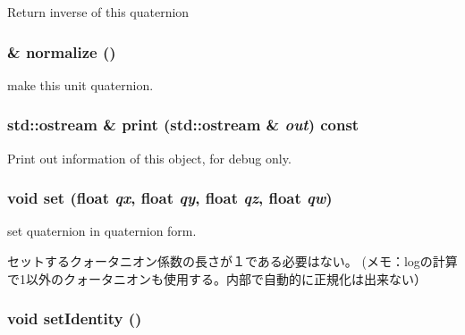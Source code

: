 Return inverse of this quaternion \hypertarget{classm3g_1_1Quaternion_c9cc178bcc449e08499113c35feb2a2b}{
\subsubsection[{normalize}]{ \& normalize ()}}
\label{classm3g_1_1Quaternion_c9cc178bcc449e08499113c35feb2a2b}


make this unit quaternion. \hypertarget{classm3g_1_1Quaternion_6fea17fa1532df3794f8cb39cb4f911f}{
\subsubsection[{print}]{\setlength{\rightskip}{0pt plus 5cm}std::ostream \& print (std::ostream \& {\em out}) const}}
\label{classm3g_1_1Quaternion_6fea17fa1532df3794f8cb39cb4f911f}


Print out information of this object, for debug only. \hypertarget{classm3g_1_1Quaternion_0712dc357557a30ac0da0a9d4cdd278c}{
\subsubsection[{set}]{\setlength{\rightskip}{0pt plus 5cm}void set (float {\em qx}, \/  float {\em qy}, \/  float {\em qz}, \/  float {\em qw})}}
\label{classm3g_1_1Quaternion_0712dc357557a30ac0da0a9d4cdd278c}


set quaternion in quaternion form.

セットするクォータニオン係数の長さが１である必要はない。 (メモ：logの計算で1以外のクォータニオンも使用する。内部で自動的に正規化は出来ない） \hypertarget{classm3g_1_1Quaternion_382e6ad7e6721b121e510959e1011be3}{
\subsubsection[{setIdentity}]{\setlength{\rightskip}{0pt plus 5cm}void setIdentity ()}}
\label{classm3g_1_1Quaternion_382e6ad7e6721b121e510959e1011be3}


